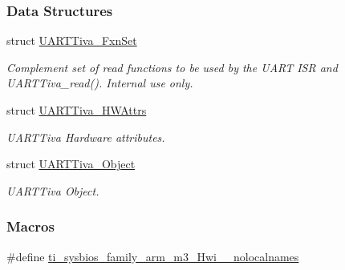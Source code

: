 \subsubsection*{Data Structures}
\begin{DoxyCompactItemize}
\item 
struct \hyperlink{struct_u_a_r_t_tiva___fxn_set}{U\+A\+R\+T\+Tiva\+\_\+\+Fxn\+Set}
\begin{DoxyCompactList}\small\item\em Complement set of read functions to be used by the U\+A\+R\+T I\+S\+R and U\+A\+R\+T\+Tiva\+\_\+read(). Internal use only. \end{DoxyCompactList}\item 
struct \hyperlink{struct_u_a_r_t_tiva___h_w_attrs}{U\+A\+R\+T\+Tiva\+\_\+\+H\+W\+Attrs}
\begin{DoxyCompactList}\small\item\em U\+A\+R\+T\+Tiva Hardware attributes. \end{DoxyCompactList}\item 
struct \hyperlink{struct_u_a_r_t_tiva___object}{U\+A\+R\+T\+Tiva\+\_\+\+Object}
\begin{DoxyCompactList}\small\item\em U\+A\+R\+T\+Tiva Object. \end{DoxyCompactList}\end{DoxyCompactItemize}
\subsubsection*{Macros}
\begin{DoxyCompactItemize}
\item 
\#define \hyperlink{_u_a_r_t_tiva_8h_aaa17ecf48f5762e2e1bdb0bab8aacf0c}{ti\+\_\+sysbios\+\_\+family\+\_\+arm\+\_\+m3\+\_\+\+Hwi\+\_\+\+\_\+nolocalnames}
\end{DoxyCompactItemize}
